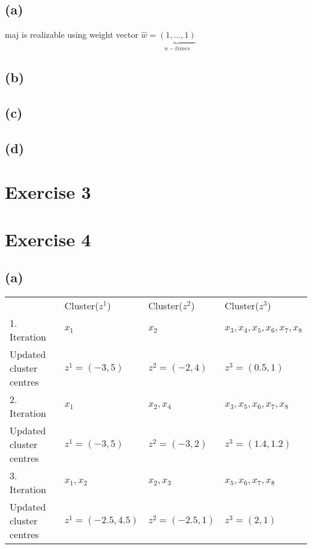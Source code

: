 \documentclass[12pt]{article}
\begin{document}
\subsection*{(a)}
maj is realizable using weight vector $\hat{w}=\underbrace{(1, \dots, 1)}_{n-times}$
\subsection*{(b)}
\subsection*{(c)}
\subsection*{(d)}

\section*{Exercise 3}
\section*{Exercise 4}
\subsection*{(a)}
\begin{table}[h!]
\begin{tabular}{llll}
                        & Cluster($z^1$)   & Cluster($z^2$) & Cluster($z^3$)                 \\
1. Iteration            & $x_1$            & $x_2$          & $x_3, x_4, x_5, x_6, x_7, x_8$ \\
Updated cluster centres & $z^1=(-3,5)$     & $z^2=(-2,4)$   & $z^3=(0.5,1)$                  \\
2. Iteration            & $x_1$            & $x_2, x_4$     & $x_3, x_5, x_6, x_7, x_8$      \\
Updated cluster centres & $z^1=(-3,5)$     & $z^2=(-3,2)$   & $z^3=(1.4,1.2)$                \\
3. Iteration            & $x_1, x_2$       & $x_2, x_3$     & $x_5, x_6, x_7, x_8$           \\
Updated cluster centres & $z^1=(-2.5,4.5)$ & $z^2=(-2.5,1)$ & $z^3=(2,1)$                   
\end{tabular}
\end{table}
\end{document}
